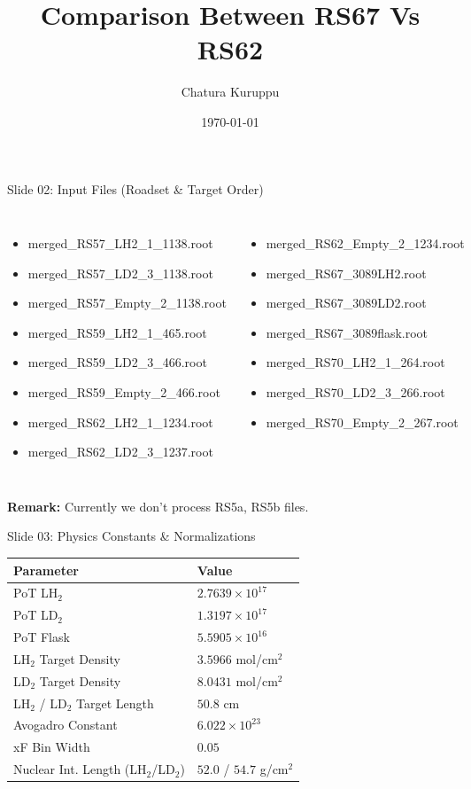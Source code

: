 \documentclass[aspectratio=169]{beamer}
\title{Comparison Between RS67 Vs RS62}
\author{Chatura Kuruppu}
\date{\today}
\begin{document}
\begin{frame}
\titlepage
\end{frame}
\begin{frame}{Slide 02: Input Files (Roadset \& Target Order)}
\begin{columns}
\tiny\begin{itemize}
\item merged\_RS57\_LH2\_1\_1138.root
\item merged\_RS57\_LD2\_3\_1138.root
\item merged\_RS57\_Empty\_2\_1138.root
\item merged\_RS59\_LH2\_1\_465.root
\item merged\_RS59\_LD2\_3\_466.root
\item merged\_RS59\_Empty\_2\_466.root
\item merged\_RS62\_LH2\_1\_1234.root
\item merged\_RS62\_LD2\_3\_1237.root
\end{itemize}\tiny\begin{itemize}
\item merged\_RS62\_Empty\_2\_1234.root
\item merged\_RS67\_3089LH2.root
\item merged\_RS67\_3089LD2.root
\item merged\_RS67\_3089flask.root
\item merged\_RS70\_LH2\_1\_264.root
\item merged\_RS70\_LD2\_3\_266.root
\item merged\_RS70\_Empty\_2\_267.root
\end{itemize}\end{columns}
\vspace{0.3cm}\centering\small\textbf{Remark:} Currently we don't process RS5a, RS5b files.
\end{frame}
\begin{frame}{Slide 03: Physics Constants \& Normalizations}
\centering\footnotesize
\begin{tabular}{ll}
\toprule \textbf{Parameter} & \textbf{Value} \\ \midrule
PoT LH$_2$ & $2.7639 \times 10^{17}$ \\
PoT LD$_2$ & $1.3197 \times 10^{17}$ \\
PoT Flask & $5.5905 \times 10^{16}$ \\
LH$_2$ Target Density & $3.5966$ mol/cm$^2$ \\
LD$_2$ Target Density & $8.0431$ mol/cm$^2$ \\
LH$_2$ / LD$_2$ Target Length & $50.8$ cm \\
Avogadro Constant & $6.022 \times 10^{23}$ \\
xF Bin Width & $0.05$ \\
Nuclear Int. Length (LH$_2$/LD$_2$) & $52.0$ / $54.7$ g/cm$^2$ \\
\bottomrule \end{tabular}
\end{frame}
\end{document}
